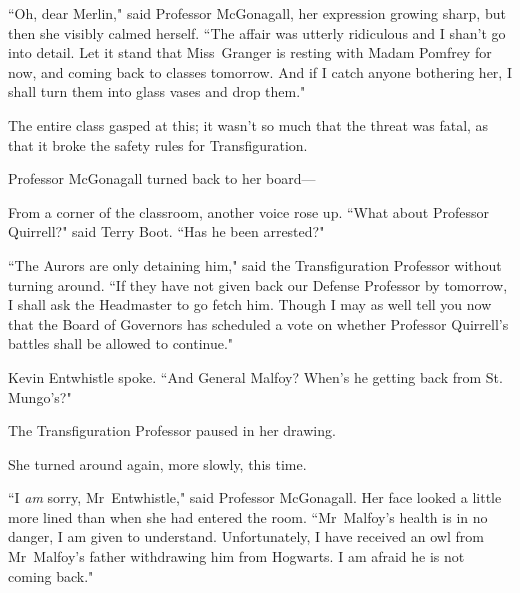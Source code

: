``Oh, dear Merlin," said Professor McGonagall, her expression growing sharp, but then she visibly calmed herself. ``The affair was utterly ridiculous and I shan't go into detail. Let it stand that Miss~Granger is resting with Madam Pomfrey for now, and coming back to classes tomorrow. And if I catch anyone bothering her, I shall turn them into glass vases and drop them."

The entire class gasped at this; it wasn't so much that the threat was fatal, as that it broke the safety rules for Transfiguration.

Professor McGonagall turned back to her board—

From a corner of the classroom, another voice rose up. ``What about Professor Quirrell?" said Terry Boot. ``Has he been arrested?"

``The Aurors are only detaining him," said the Transfiguration Professor without turning around. ``If they have not given back our Defense Professor by tomorrow, I shall ask the Headmaster to go fetch him. Though I may as well tell you now that the Board of Governors has scheduled a vote on whether Professor Quirrell's battles shall be allowed to continue."

Kevin Entwhistle spoke. ``And General Malfoy? When's he getting back from St. Mungo's?"

The Transfiguration Professor paused in her drawing.

She turned around again, more slowly, this time.

``I \emph{am} sorry, Mr~Entwhistle," said Professor McGonagall. Her face looked a little more lined than when she had entered the room. ``Mr~Malfoy's health is in no danger, I am given to understand. Unfortunately, I have received an owl from Mr~Malfoy's father withdrawing him from Hogwarts. I am afraid he is not coming back."
